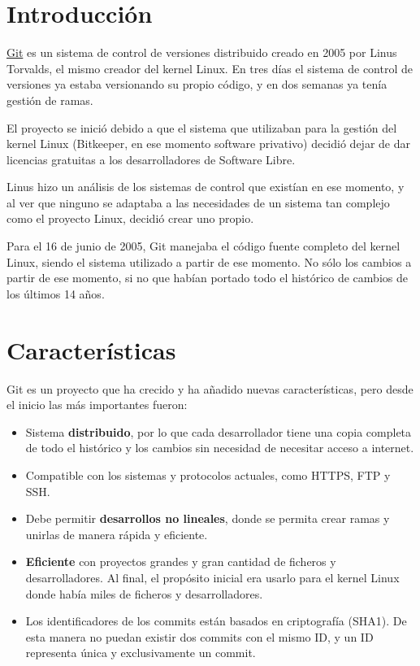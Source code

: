 \chapter{Introducción}

\href{https://git-scm.com/}{Git} es un sistema de control de versiones distribuido creado en 2005 por Linus Torvalds, el mismo creador del kernel Linux. En tres días el sistema de control de versiones ya estaba versionando su propio código, y en dos semanas ya tenía gestión de ramas.

El proyecto se inició debido a que el sistema que utilizaban para la gestión del kernel Linux (Bitkeeper, en ese momento software privativo) decidió dejar de dar licencias gratuitas a los desarrolladores de Software Libre.

Linus hizo un análisis de los sistemas de control que existían en ese momento, y al ver que ninguno se adaptaba a las necesidades de un sistema tan complejo como el proyecto Linux, decidió crear uno propio.

Para el 16 de junio de 2005, Git manejaba el código fuente completo del kernel Linux, siendo el sistema utilizado a partir de ese momento. No sólo los cambios a partir de ese momento, si no que habían portado todo el histórico de cambios de los últimos 14 años.

\chapter{Características}

Git es un proyecto que ha crecido y ha añadido nuevas características, pero desde el inicio las más importantes fueron:

\begin{itemize}
    \item Sistema \textbf{distribuido}, por lo que cada desarrollador tiene una copia completa de todo el histórico y los cambios sin necesidad de necesitar acceso a internet.

    \item Compatible con los sistemas y protocolos actuales, como HTTPS, FTP y SSH.

    \item Debe permitir \textbf{desarrollos no lineales}, donde se permita crear ramas y unirlas de manera rápida y eficiente.

    \item \textbf{Eficiente} con proyectos grandes y gran cantidad de ficheros y desarrolladores. Al final, el propósito inicial era usarlo para el kernel Linux donde había miles de ficheros y desarrolladores.

    \item Los identificadores de los commits están basados en criptografía (SHA1). De esta manera no puedan existir dos commits con el mismo ID, y un ID representa única y exclusivamente un commit.
\end{itemize}


